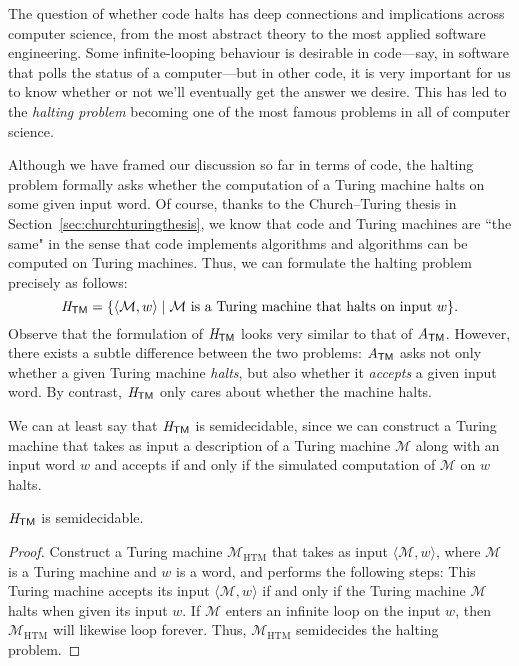 The question of whether code halts has deep connections and implications across computer science, from the most abstract theory to the most applied software engineering. Some infinite-looping behaviour is desirable in code---say, in software that polls the status of a computer---but in other code, it is very important for us to know whether or not we'll eventually get the answer we desire. This has led to the \emph{halting problem} becoming one of the most famous problems in all of computer science.

Although we have framed our discussion so far in terms of code, the halting problem formally asks whether the computation of a Turing machine halts on some given input word. Of course, thanks to the Church--Turing thesis in Section~\ref{sec:churchturingthesis}, we know that code and Turing machines are ``the same" in the sense that code implements algorithms and algorithms can be computed on Turing machines. Thus, we can formulate the halting problem precisely as follows:
\begin{equation*}
\mathit{H}_{\textsf{TM}} = \{\langle \mathcal{M}, w \rangle \mid \mathcal{M} \text{ is a Turing machine that halts on input } w\}.
\end{equation*}
Observe that the formulation of $\mathit{H}_{\textsf{TM}}$ looks very similar to that of $A_{\textsf{TM}}$. However, there exists a subtle difference between the two problems: $A_{\textsf{TM}}$ asks not only whether a given Turing machine \emph{halts}, but also whether it \emph{accepts} a given input word. By contrast, $\mathit{H}_{\textsf{TM}}$ only cares about whether the machine halts.

We can at least say that $\mathit{H}_{\textsf{TM}}$ is semidecidable, since we can construct a Turing machine that takes as input a description of a Turing machine $\mathcal{M}$ along with an input word $w$ and accepts if and only if the simulated computation of $\mathcal{M}$ on $w$ halts.

\begin{theorem}\label{thm:HTMsemidecidable}
$\mathit{H}_{\textsf{TM}}$ is semidecidable.

\begin{proof}
Construct a Turing machine $\mathcal{M}_{\mathrm{HTM}}$ that takes as input $\langle \mathcal{M}, w \rangle$, where $\mathcal{M}$ is a Turing machine and $w$ is a word, and performs the following steps:
This Turing machine accepts its input $\langle \mathcal{M}, w \rangle$ if and only if the Turing machine $\mathcal{M}$ halts when given its input $w$. If $\mathcal{M}$ enters an infinite loop on the input $w$, then $\mathcal{M}_{\mathrm{HTM}}$ will likewise loop forever. Thus, $\mathcal{M}_{\mathrm{HTM}}$ semidecides the halting problem.
\end{proof}
\end{theorem}

